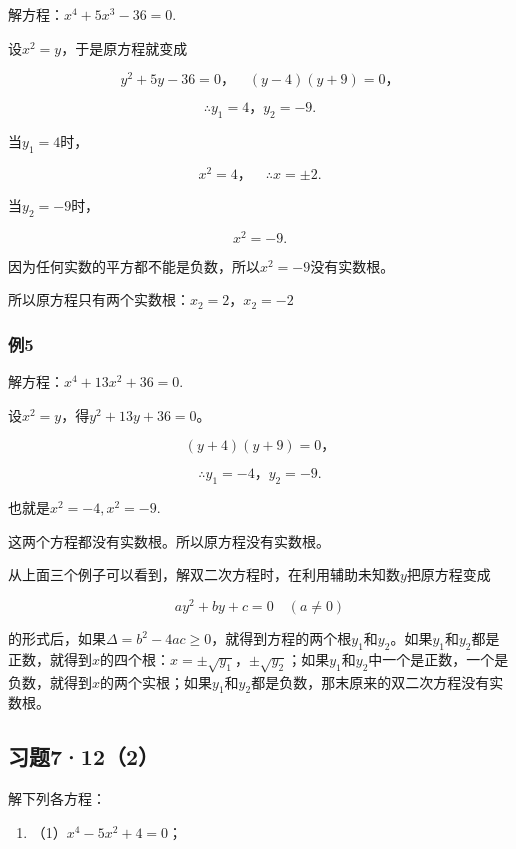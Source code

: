 解方程：\(x^{4} + 5x^{3} - 36 = 0.\)

 设\(x^{2} = y\)，于是原方程就变成

\[
y ^ {2} + 5 y - 36 = 0\text{，} \quad (y - 4) (y + 9) = 0\text{，}
\]

\[
\therefore y _ {1} = 4\text{，} y _ {2} = - 9.
\]

当\(y_{1} = 4\)时，

\[
x ^ {2} = 4\text{，} \quad \therefore x = \pm 2.
\]

当\(y_{2} = -9\)时，

\[
x ^ {2} = - 9.
\]

因为任何实数的平方都不能是负数，所以\(x^{2} = -9\)没有实数根。

所以原方程只有两个实数根：\(x_{2} = 2\)，\(x_{2} = -2\)

\subsubsection{例5}

解方程：\(x^{4} + 13x^{2} + 36 = 0.\)

 设\(x^{2} = y\)，得\(y^{2} + 13y + 36 = 0\)。

\[
(y + 4) (y + 9) = 0\text{，}
\]

\[
\therefore y _ {1} = - 4\text{，} y _ {2} = - 9.
\]

也就是\(x^{2} = -4, x^{2} = -9.\)

这两个方程都没有实数根。所以原方程没有实数根。

从上面三个例子可以看到，解双二次方程时，在利用辅助未知数\(y\)把原方程变成

\[
a y ^ {2} + b y + c = 0 \quad (a \neq 0)
\]

的形式后，如果\(\Delta = b^{2} - 4ac \geqslant 0\)，就得到方程的两个根\(y_{1}\)和\(y_{2}\)。如果\(y_{1}\)和\(y_{2}\)都是正数，就得到\(x\)的四个根：\(x = \pm \sqrt{y_{1}}\)，\(\pm \sqrt{y_{2}}\)；如果\(y_{1}\)和\(y_{2}\)中一个是正数，一个是负数，就得到\(x\)的两个实根；如果\(y_{1}\)和\(y_{2}\)都是负数，那末原来的双二次方程没有实数根。

\subsection{习题7·12（2）}

解下列各方程：

\begin{enumerate}
\item
  （1）\(x^{4} - 5x^{2} + 4 = 0\)；
\end{enumerate}

